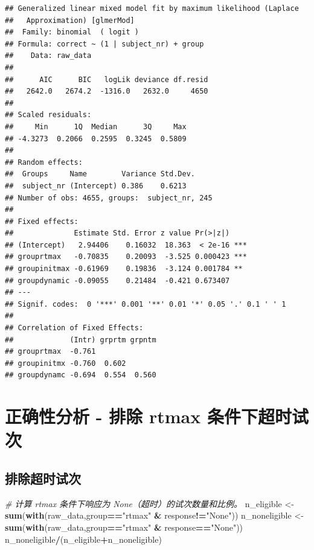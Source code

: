 \documentclass[
]{article}
\newenvironment{Shaded}{\begin{snugshade}}{\end{snugshade}}
\newcommand{\CommentTok}[1]{\textcolor[rgb]{0.56,0.35,0.01}{\textit{#1}}}
\newcommand{\FunctionTok}[1]{\textcolor[rgb]{0.13,0.29,0.53}{\textbf{#1}}}
\newcommand{\NormalTok}[1]{#1}
\newcommand{\OtherTok}[1]{\textcolor[rgb]{0.56,0.35,0.01}{#1}}
\newcommand{\SpecialCharTok}[1]{\textcolor[rgb]{0.81,0.36,0.00}{\textbf{#1}}}
\newcommand{\StringTok}[1]{\textcolor[rgb]{0.31,0.60,0.02}{#1}}
\begin{document}
\begin{verbatim}
## Generalized linear mixed model fit by maximum likelihood (Laplace
##   Approximation) [glmerMod]
##  Family: binomial  ( logit )
## Formula: correct ~ (1 | subject_nr) + group
##    Data: raw_data
## 
##      AIC      BIC   logLik deviance df.resid 
##   2642.0   2674.2  -1316.0   2632.0     4650 
## 
## Scaled residuals: 
##     Min      1Q  Median      3Q     Max 
## -4.3273  0.2066  0.2595  0.3245  0.5809 
## 
## Random effects:
##  Groups     Name        Variance Std.Dev.
##  subject_nr (Intercept) 0.386    0.6213  
## Number of obs: 4655, groups:  subject_nr, 245
## 
## Fixed effects:
##              Estimate Std. Error z value Pr(>|z|)    
## (Intercept)   2.94406    0.16032  18.363  < 2e-16 ***
## grouprtmax   -0.70835    0.20093  -3.525 0.000423 ***
## groupinitmax -0.61969    0.19836  -3.124 0.001784 ** 
## groupdynamic -0.09055    0.21484  -0.421 0.673407    
## ---
## Signif. codes:  0 '***' 0.001 '**' 0.01 '*' 0.05 '.' 0.1 ' ' 1
## 
## Correlation of Fixed Effects:
##             (Intr) grprtm grpntm
## grouprtmax  -0.761              
## groupinitmx -0.760  0.602       
## groupdynamc -0.694  0.554  0.560
\end{verbatim}

\section{正确性分析 - 排除 rtmax
条件下超时试次}\label{ux6b63ux786eux6027ux5206ux6790---ux6392ux9664-rtmax-ux6761ux4ef6ux4e0bux8d85ux65f6ux8bd5ux6b21}

\subsection{排除超时试次}\label{ux6392ux9664ux8d85ux65f6ux8bd5ux6b21}

\begin{Shaded}
\begin{Highlighting}[]
\CommentTok{\# 计算 rtmax 条件下响应为 None（超时）的试次数量和比例。}
\NormalTok{n\_eligible }\OtherTok{\textless{}{-}} \FunctionTok{sum}\NormalTok{(}\FunctionTok{with}\NormalTok{(raw\_data,group}\SpecialCharTok{==}\StringTok{"rtmax"} \SpecialCharTok{\&}\NormalTok{ response}\SpecialCharTok{!=}\StringTok{"None"}\NormalTok{))}
\NormalTok{n\_noneligible }\OtherTok{\textless{}{-}} \FunctionTok{sum}\NormalTok{(}\FunctionTok{with}\NormalTok{(raw\_data,group}\SpecialCharTok{==}\StringTok{"rtmax"} \SpecialCharTok{\&}\NormalTok{ response}\SpecialCharTok{==}\StringTok{"None"}\NormalTok{))}
\NormalTok{n\_noneligible}\SpecialCharTok{/}\NormalTok{(n\_eligible}\SpecialCharTok{+}\NormalTok{n\_noneligible)}
\end{Highlighting}
\end{Shaded}
\end{document}

